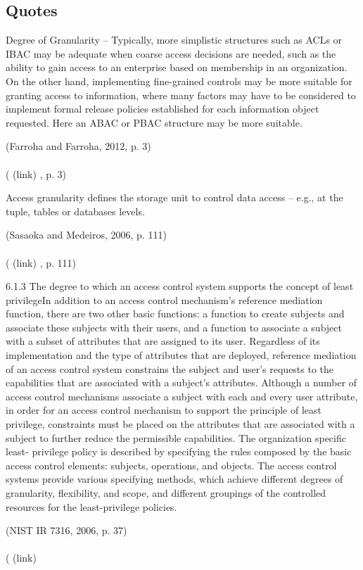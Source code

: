 \subsection*{Quotes } \begin{DIC_BlockQuote} Degree of Granularity -- Typically, more simplistic structures such as ACLs or IBAC may be adequate when coarse access decisions are needed, such as the ability to gain access to an enterprise based on membership in an organization. On the other hand, implementing fine-grained controls may be more suitable for granting access to information, where many factors may have to be considered to implement formal release policies established for each information object requested. Here an ABAC or PBAC structure may be more suitable.  \end{DIC_BlockQuote} (Farroha and Farroha, 2012, p. 3)  \paragraph{} (  (link) \href{Farroha and Farroha, 2012 }{ } , p. 3)  \begin{DIC_BlockQuote} Access granularity defines the storage unit to control data access -- e.g., at the tuple, tables or databases levels.  \end{DIC_BlockQuote} (Sasaoka and Medeiros, 2006, p. 111)  \paragraph{} (  (link) \href{Sasaoka and Medeiros, 2006 }{ } , p. 111)  \begin{DIC_BlockQuote} 6.1.3 The degree to which an access control system supports the concept of least privilegeIn addition to an access control mechanism's reference mediation function, there are two other basic functions: a function to create subjects and associate these subjects with their users, and a function to associate a subject with a subset of attributes that are assigned to its user. Regardless of its implementation and the type of attributes that are deployed, reference mediation of an access control system constrains the subject and user's requests to the capabilities that are associated with a subject's attributes. Although a number of access control mechanisms associate a subject with each and every user attribute, in order for an access control mechanism to support the principle of least privilege, constraints must be placed on the attributes that are associated with a subject to further reduce the permissible capabilities. The organization specific least- privilege policy is described by specifying the rules composed by the basic access control elements: subjects, operations, and objects. The access control systems provide various specifying methods, which achieve different degrees of granularity, flexibility, and scope, and different groupings of the controlled resources for the least-privilege policies.  \end{DIC_BlockQuote} (NIST IR 7316, 2006, p. 37)  \paragraph{} (  (link) 